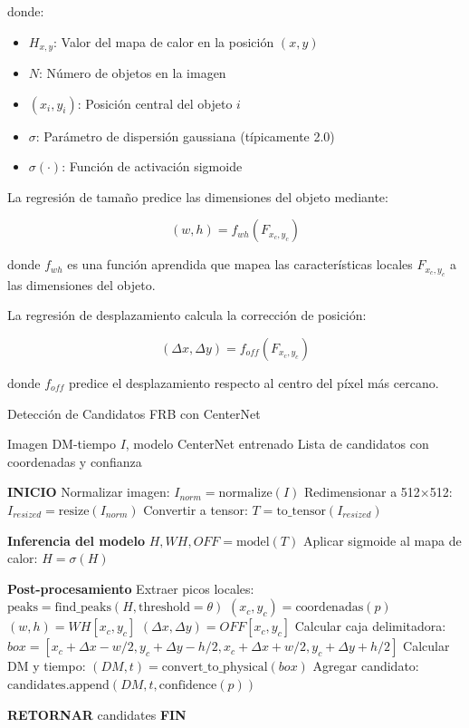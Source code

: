 donde:
\begin{itemize}
    \item $H_{x,y}$: Valor del mapa de calor en la posición $(x,y)$
    \item $N$: Número de objetos en la imagen
    \item $(x_i, y_i)$: Posición central del objeto $i$
    \item $\sigma$: Parámetro de dispersión gaussiana (típicamente 2.0)
    \item $\sigma(\cdot)$: Función de activación sigmoide
\end{itemize}

La regresión de tamaño predice las dimensiones del objeto mediante:

\[
(w, h) = f_{wh}(F_{x_c, y_c})
\]

donde $f_{wh}$ es una función aprendida que mapea las características locales $F_{x_c, y_c}$ a las dimensiones del objeto.

La regresión de desplazamiento calcula la corrección de posición:

\[
(\Delta x, \Delta y) = f_{off}(F_{x_c, y_c})
\]

donde $f_{off}$ predice el desplazamiento respecto al centro del píxel más cercano.

\begin{algorithm}[H]
\caption{Detección de Candidatos FRB con CenterNet}
\label{alg:centernet-detection}
\begin{algorithmic}[1]
\Require Imagen DM-tiempo $I$, modelo CenterNet entrenado
\Ensure Lista de candidatos con coordenadas y confianza

\State \textbf{INICIO}
\State Normalizar imagen: $I_{norm} = \text{normalize}(I)$
\State Redimensionar a 512×512: $I_{resized} = \text{resize}(I_{norm})$
\State Convertir a tensor: $T = \text{to\_tensor}(I_{resized})$

\State \textbf{Inferencia del modelo}
\State $H, WH, OFF = \text{model}(T)$ 
\State Aplicar sigmoide al mapa de calor: $H = \sigma(H)$

\State \textbf{Post-procesamiento}
\State Extraer picos locales: $\text{peaks} = \text{find\_peaks}(H, \text{threshold}=\theta)$
    \State $(x_c, y_c) = \text{coordenadas}(p)$
    \State $(w, h) = WH[x_c, y_c]$ 
    \State $(\Delta x, \Delta y) = OFF[x_c, y_c]$ 
    \State Calcular caja delimitadora: $box = [x_c + \Delta x - w/2, y_c + \Delta y - h/2, x_c + \Delta x + w/2, y_c + \Delta y + h/2]$
    \State Calcular DM y tiempo: $(DM, t) = \text{convert\_to\_physical}(box)$
    \State Agregar candidato: $\text{candidates.append}(DM, t, \text{confidence}(p))$
\EndFor

\State \textbf{RETORNAR} candidates
\State \textbf{FIN}
\end{algorithmic}
\end{algorithm}
